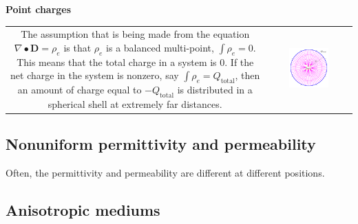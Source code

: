\textbf{Point charges}

\begin{tabular}{cc}
\parbox{0.5\textwidth}{
The assumption that is being made from the equation \(\nabla \bullet \mathbf{D} = \rho_e\) is that \(\rho_e\) is a balanced multi-point, \(\int \rho_e = 0\). This means that the total charge in a system is \(0\). If the net charge in the system is nonzero, say \(\int \rho_e = Q_{\text{total}}\), then an amount of charge equal to \(-Q_{\text{total}}\) is distributed in a spherical shell at extremely far distances.   
} & \parbox{0.5\textwidth}{
\includegraphics[width = 0.5\textwidth]{Duality/charge_sphere_at_infinity}
}
\end{tabular}




\subsection{Nonuniform permittivity and permeability} 

Often, the permittivity and permeability are different at different positions.



\subsection{Anisotropic mediums}










